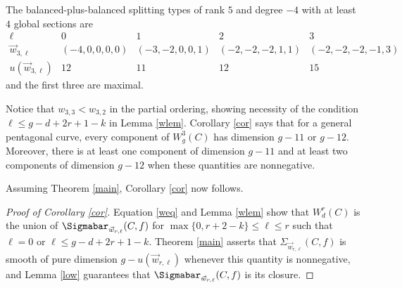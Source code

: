 \begin{Example}
The balanced-plus-balanced splitting types of rank $5$ and degree $-4$ with at least
$4$ global sections are
\[
\begin{array}{c|cccc}
\ell & 0 & 1 & 2 & 3\\
\vec{w}_{3,\ell} & (-4,0,0,0,0) & (-3,-2,0,0,1) &
(-2,-2,-2,1,1) & (-2,-2,-2,-1,3)\\
u(\vec{w}_{3,\ell}) & 12 & 11 & 12 & 15
\end{array}
\]
and the first three are maximal.

Notice that $w_{3,3} < w_{3,2}$ in the partial ordering, showing necessity of the condition $\ell \leq g - d + 2r + 1 - k$ in Lemma \ref{wlem}.
Corollary \ref{cor} says that for a general pentagonal curve, every component of $W^3_g(C)$ has dimension $g - 11$ or $g - 12$. Moreover, there is at least one component of dimension $g - 11$ and at least  two components of dimension $g - 12$ when these quantities are nonnegative.
\end{Example}

Assuming Theorem \ref{main}, Corollary \ref{cor} now follows.

\begin{proof}[Proof of Corollary \ref{cor}]
Equation \eqref{weq} and Lemma \ref{wlem} show that $W^r_d(C)$ is the union of $\Sigmabar_{\vec{w}_{r,\ell}}(C, f)$ for $\max\{0, r+2 - k\} \leq \ell \leq r$
such that $\ell = 0$ or $\ell \leq g - d + 2r + 1 - k$. Theorem \ref{main} asserts that $\Sigma_{\vec{w}_{r,\ell}}(C, f)$ is smooth of pure dimension $g - u(\vec{w}_{r,\ell})$ whenever this quantity is nonnegative, and Lemma \ref{low} guarantees that $\Sigmabar_{\vec{w}_{r,\ell}}(C, f)$ is its closure.
\end{proof}
